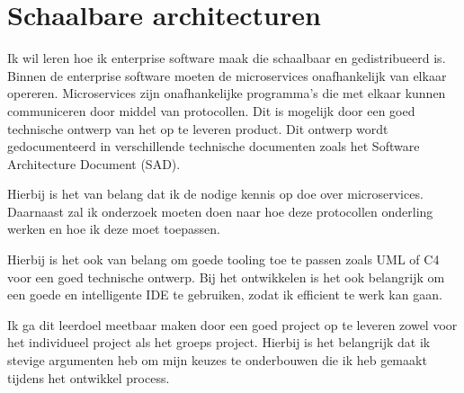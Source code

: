\section{Schaalbare architecturen}\label{sec:schaalbare-architecturen}


Ik wil leren hoe ik enterprise software maak die schaalbaar en gedistribueerd is.
Binnen de enterprise software moeten de microservices onafhankelijk van elkaar opereren.
Microservices zijn onafhankelijke programma's die met elkaar kunnen communiceren door middel van protocollen.
Dit is mogelijk door een goed technische ontwerp van het op te leveren product.
Dit ontwerp wordt gedocumenteerd in verschillende technische documenten zoals het Software Architecture Document (SAD).

Hierbij is het van belang dat ik de nodige kennis op doe over microservices.
Daarnaast zal ik onderzoek moeten doen naar hoe deze protocollen onderling werken en hoe ik deze moet toepassen.

Hierbij is het ook van belang om goede tooling toe te passen zoals UML of C4 voor een goed technische ontwerp.
Bij het ontwikkelen is het ook belangrijk om een goede en intelligente IDE te gebruiken, zodat ik efficient te werk
kan gaan.

Ik ga dit leerdoel meetbaar maken door een goed project op te leveren zowel voor het individueel project als het
groeps project.
Hierbij is het belangrijk dat ik stevige argumenten heb om mijn keuzes te onderbouwen die ik heb gemaakt tijdens
het ontwikkel process.


